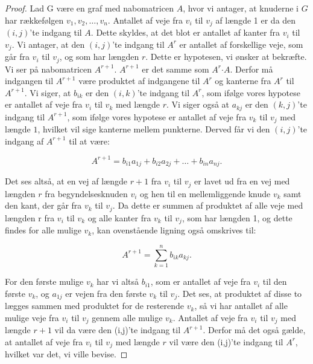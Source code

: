 \begin{proof}
Lad G være en graf med nabomatricen 
\textbf{$A$}, hvor vi antager, at knuderne i $G$ har rækkefølgen $v_{1},v_{2},\dotsc,v_{n}$. Antallet af veje fra $v_{i}$ til $v_{j}$ af længde 1 er da den $(i,j)$'te indgang til 
\textbf{$A$}. Dette skyldes, at det blot er antallet af kanter fra $v_{i}$ til $v_{j}$.
Vi antager, at den $(i,j)$'te indgang til 
\textbf{${A^r}$} er antallet af forskellige veje, som går fra $v_{i}$ til $v_{j}$, og som har længden $r$. Dette er hypotesen, vi ønsker at bekræfte.
Vi ser på nabomatricen \textbf{$A^{r+1}$}. 
\textbf{$A^{r+1}$} er det samme som 
\textbf{$A^{r}$}$\cdot$\textbf{$A$}. Derfor må indgangen til \textbf{$A^{r+1}$} være produktet af indgangene til \textbf{$A^{r}$} og kanterne fra \textbf{$A^{r}$} til \textbf{$A^{r+1}$}. Vi siger, at $b_{ik}$ er den $(i,k)$'te indgang til 
\textbf{$A^{r}$}, som ifølge vores hypotese er antallet af veje fra $v_{i}$ til $v_{k}$ med længde $r$. Vi siger også at $a_{kj}$ er den $(k,j)$'te indgang til 
\textbf{$A^{r+1}$}, som ifølge vores hypotese er antallet af veje fra $v_{k}$ til $v_{j}$ med længde $1$, hvilket vil sige kanterne mellem punkterne. Derved får vi den $(i,j)$'te indgang af \textbf{$A^{r+1}$} til at være: 

\begin{equation}
A^{r+1}=b_{i1}a_{1j} + b_{i2}a_{2j} +\dotsc+ b_{in}a_{nj}.
\end{equation}

Det ses altså, at en vej af længde $r + 1$ fra $v_{i}$ til $v_{j}$ er lavet ud fra en vej med længden $r$ fra begyndelsesknuden $v_{i}$ og hen til en mellemliggende knude $v_{k}$ samt den kant, der går fra $v_{k}$ til $v_{j}$. 
Da dette er summen af produktet af alle veje med længden r fra $v_{i}$ til $v_{k}$ og alle kanter fra $v_{k}$ til $v_{j}$, som har længden 1, og dette findes for alle mulige $v_{k}$, kan ovenstående ligning også omskrives til: 

\begin{equation}
A^{r+1}=\sum_{k=1}^{n} b_{ik} a_{kj}.
\end{equation}

For den første mulige $v_{k}$ har vi altså $b_{i1}$, som er antallet af veje fra $v_{i}$ til den første $v_{k}$, og $a_{1j}$ er vejen fra den første $v_{k}$ til $v_{j}$. Det ses, at produktet af disse to lægges sammen med produktet for de resterende $v_{k}$, så vi har antallet af alle mulige veje fra $v_{i}$ til $v_{j}$ gennem alle mulige $v_{k}$. Antallet af veje fra $v_{i}$ til $v_{j}$ med længde $r+1$ vil da være den (i,j)'te indgang til $A^{r+1}$. Derfor må det også gælde, at antallet af veje fra $v_{i}$ til $v_{j}$ med længde $r$ vil være den (i,j)'te indgang til $A^{r}$, hvilket var det, vi ville bevise.

\end{proof}

